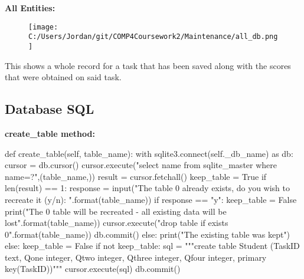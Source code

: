 \textbf{All Entities: }

\begin{figure}[H]
    \texttt{[image: C:/Users/Jordan/git/COMP4Coursework2/Maintenance/all\_db.png]}
    \label{fig:print_function_result}
\end{figure}

This shows a whole record for a task that has been saved along with the scores that were obtained on said task.

\subsection{Database SQL}

\textbf{create\_table method: }

\begin{python}
def create_table(self, table_name):
        with sqlite3.connect(self._db_name) as db:
            cursor = db.cursor()
            cursor.execute("select name from sqlite_master where name=?",(table_name,))
            result = cursor.fetchall()
            keep_table = True
            if len(result) == 1:
                response = input("The table {0} already exists, do you wish to recreate it (y/n): ".format(table_name))
                if response == "y":
                    keep_table = False
                    print("The {0} table will be recreated - all existing data will be lost".format(table_name))
                    cursor.execute("drop table if exists {0}".format(table_name))
                    db.commit()
                else:
                    print("The existing table was kept")
            else:
                keep_table = False
            if not keep_table:
                sql = """create table Student
                (TaskID text,
                Qone integer,
                Qtwo integer,
                Qthree integer,
                Qfour integer,
                primary key(TaskID))"""
                cursor.execute(sql)
                db.commit()
\end{python}

